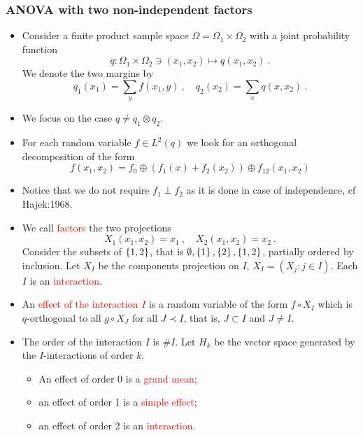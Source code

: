 \documentclass[xcolor=svgnames]{beamer}
\newcommand{\rosso}[1]{\textcolor{red}{#1}}
\renewcommand{\emph}{\rosso}
\begin{document}
    \begin{frame}\small\frametitle{ANOVA with two non-independent factors}

    \begin{itemize}
    \item Consider a finite product sample space $\Omega = \Omega_1 \times \Omega_2$ with a joint probability function 
    \begin{equation*}
       q \colon  \Omega_1 \times \Omega _2 \ni (x_1,x_2) \mapsto q(x_1,x_2) \ . 
    \end{equation*}
    We denote the two margins by 
    \begin{equation*}
    q_1(x_1) = \sum_y f(x_1,y) \ , \quad q_2(x_2) = \sum_x q(x,x_2) \ .
    \end{equation*}
    \item We focus on the case $q \neq q_1 \otimes q_2$.
    \item For each random variable $f \in L^2(q)$ we look for an orthogonal decomposition of the form
    \begin{equation*}
        f(x_1,x_2) = f_0 \oplus (f_1(x) + f_2(x_2)) \oplus f_{12}(x_1,x_2)
    \end{equation*}
    \item Notice that we do not require $f_1 \perp f_2$ as it is done in case of independence, cf Hajek:1968.
    \item We call \emph{factors} the two projections \begin{equation*}
    X_1(x_1,x_2) = x_1 \ , \quad X_2(x_1,x_2) = x_2 \ .  
    \end{equation*}
    Consider the subsets of $\left\{1,2\right\}$, that is $\emptyset, \left\{1\right\},\left\{2\right\},\left\{1,2\right\}$, partially ordered by inclusion. Let $X_I$ be the components projection on $I$, $X_I = (X_j \colon j \in I)$. Each $I$ is an \emph{interaction}. 
    \item An \emph{effect of the interaction $I$} is a random variable of the form $f\circ X_I$ which is $q$-orthogonal to all $g \circ X_J$ for all $J \prec I$, that is, $J \subset I$ and $J \neq I$.
    \item The order of the interaction $I$ is $\# I$. Let $H_k$ be the vector space generated by the $I$-interactions of order $k$.
      \begin{itemize}
    \item An effect of order 0 is a \emph{grand mean};
    \item an effect of order 1 is a \emph{simple effect};
      \item an effect of order 2 is an \emph{interaction}.

\end{itemize}
\end{itemize}
\end{frame}
\end{document}
